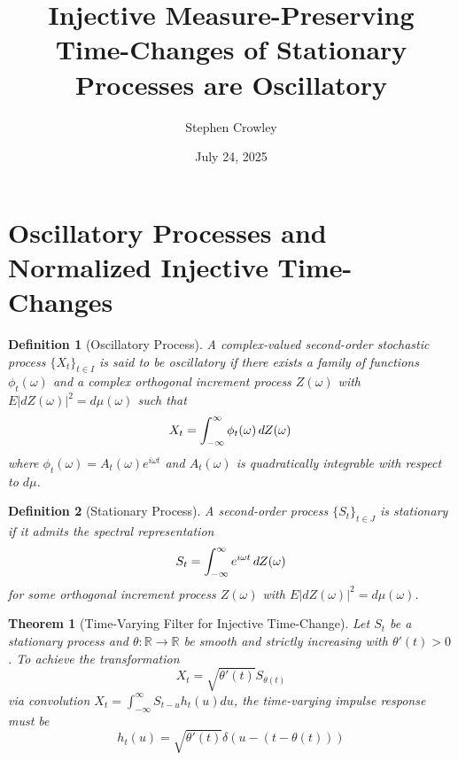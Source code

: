 \documentclass{article}
\newtheorem{definition}{Definition}
\newtheorem{theorem}{Theorem}
\begin{document}
\title{Injective Measure-Preserving Time-Changes of Stationary Processes are
Oscillatory}

\author{Stephen Crowley}

\date{July 24, 2025}

\maketitle

\section*{Oscillatory Processes and Normalized Injective Time-Changes}

\begin{definition}
  [Oscillatory Process] A complex-valued second-order stochastic process
  $\{X_t \}_{t \in I}$ is said to be oscillatory if there exists a family of
  functions $\phi_t (\omega)$ and a complex orthogonal increment process $Z
  (\omega)$ with $E |dZ (\omega) |^2 = d \mu (\omega)$ such that
  \begin{equation}
    X_t = \int_{- \infty}^{\infty} \phi_t (\omega)  \hspace{0.17em} dZ
    (\omega) \hspace{0.17em}
  \end{equation}
  where $\phi_t (\omega) = A_t (\omega) e^{i \omega t}$ and $A_t (\omega)$ is
  quadratically integrable with respect to $d \mu$.
\end{definition}

\begin{definition}
  [Stationary Process] A second-order process $\{S_t \}_{t \in J}$ is
  stationary if it admits the spectral representation
  \begin{equation}
    S_t = \int_{- \infty}^{\infty} e^{i \omega t}  \hspace{0.17em} dZ (\omega)
  \end{equation}
  for some orthogonal increment process $Z (\omega)$ with $E |dZ (\omega) |^2
  = d \mu (\omega)$.
\end{definition}

\begin{theorem}
  [Time-Varying Filter for Injective Time-Change] Let $S_t$ be a stationary
  process and $\theta : \mathbb{R} \to \mathbb{R}$ be smooth and strictly
  increasing with $\theta' (t) > 0$. To achieve the transformation
  \begin{equation}
    X_t = \sqrt{\theta' (t)} S_{\theta (t)}
  \end{equation}
  via convolution $X_t = \int_{- \infty}^{\infty} S_{t - u} h_t (u) du$, the
  time-varying impulse response must be
  \begin{equation}
    h_t (u) = \sqrt{\theta' (t)} \delta (u - (t - \theta (t)))
  \end{equation}
\end{theorem}
\end{document}
